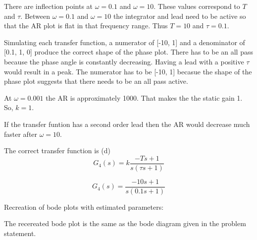 \documentclass[12pt]{article}
\begin{document}
\begin{enumerate}
    There are inflection points at $\omega = 0.1$ and $\omega = 10$. These values correspond to $T$ and $\tau$. Between $\omega = 0.1$ and $\omega = 10$ the integrator and lead need to be active so that the AR plot is flat in that frequency range. Thus $\boxed{T=10}$ and $\boxed{\tau=0.1}$.

    Simulating each transfer function, a numerator of [-10, 1] and a denominator of [0.1, 1, 0] produce the correct shape of the phase plot. There has to be an all pass because the phase angle is constantly decreasing. Having a lead with a positive $\tau$ would result in a peak. The numerator has to be [-10, 1] becasue the shape of the phase plot suggests that there needs to be an all pass active.

    At $\omega = 0.001$ the AR is approximately 1000. That makes the the static gain 1. So, $\boxed{k=1}$.

    If the transfer funtion has a second order lead then the AR would decrease much faster after $\omega = 10$.

    The correct transfer function is (d)
    \[
        G_4(s) = k \frac{-Ts + 1}{s (\tau s + 1)}  
    \]

    \[
        G_4(s) = \frac{-10s + 1}{s (0.1 s + 1)}  
    \]

    Recreation of bode plots with estimated parameters:

    \begin{center}
        
    \end{center}

    The recereated bode plot is the same as the bode diagram given in the problem statement.

    
    
\end{enumerate}
\end{document}
